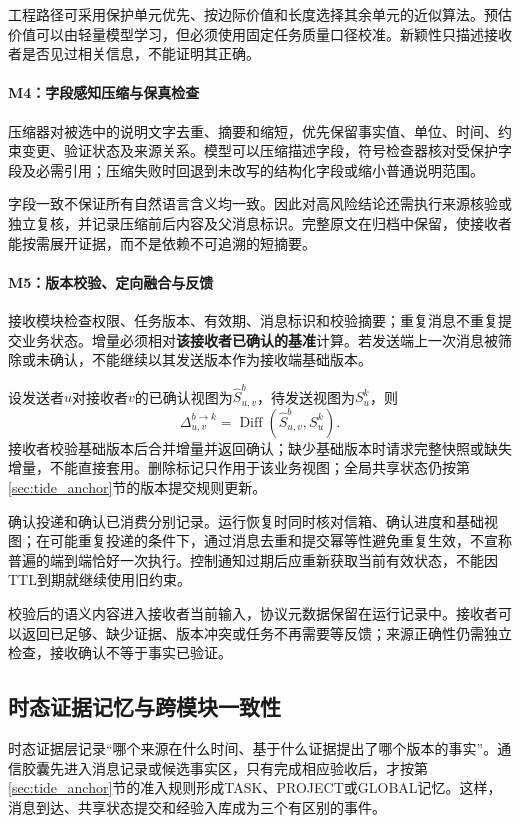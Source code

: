 工程路径可采用保护单元优先、按边际价值和长度选择其余单元的近似算法。预估价值可以由轻量模型学习，但必须使用固定任务质量口径校准。新颖性只描述接收者是否见过相关信息，不能证明其正确。

\paragraph{M4：字段感知压缩与保真检查}
压缩器对被选中的说明文字去重、摘要和缩短，优先保留事实值、单位、时间、约束变更、验证状态及来源关系。模型可以压缩描述字段，符号检查器核对受保护字段及必需引用；压缩失败时回退到未改写的结构化字段或缩小普通说明范围。

字段一致不保证所有自然语言含义均一致。因此对高风险结论还需执行来源核验或独立复核，并记录压缩前后内容及父消息标识。完整原文在归档中保留，使接收者能按需展开证据，而不是依赖不可追溯的短摘要。

\paragraph{M5：版本校验、定向融合与反馈}
接收模块检查权限、任务版本、有效期、消息标识和校验摘要；重复消息不重复提交业务状态。增量必须相对\textbf{该接收者已确认的基准}计算。若发送端上一次消息被筛除或未确认，不能继续以其发送版本作为接收端基础版本。

设发送者$u$对接收者$v$的已确认视图为$\widehat{S}_{u,v}^{b}$，待发送视图为$S_u^{k}$，则
\begin{equation}
\Delta_{u,v}^{b\rightarrow k}
=\operatorname{Diff}(\widehat{S}_{u,v}^{b},S_u^{k}).
\end{equation}
接收者校验基础版本后合并增量并返回确认；缺少基础版本时请求完整快照或缺失增量，不能直接套用。删除标记只作用于该业务视图；全局共享状态仍按第\ref{sec:tide_anchor}节的版本提交规则更新。

确认投递和确认已消费分别记录。运行恢复时同时核对信箱、确认进度和基础视图；在可能重复投递的条件下，通过消息去重和提交幂等性避免重复生效，不宣称普遍的端到端恰好一次执行。控制通知过期后应重新获取当前有效状态，不能因TTL到期就继续使用旧约束。

校验后的语义内容进入接收者当前输入，协议元数据保留在运行记录中。接收者可以返回已足够、缺少证据、版本冲突或任务不再需要等反馈；来源正确性仍需独立检查，接收确认不等于事实已验证。

\subsection{时态证据记忆与跨模块一致性}

时态证据层记录“哪个来源在什么时间、基于什么证据提出了哪个版本的事实”。通信胶囊先进入消息记录或候选事实区，只有完成相应验收后，才按第\ref{sec:tide_anchor}节的准入规则形成TASK、PROJECT或GLOBAL记忆。这样，消息到达、共享状态提交和经验入库成为三个有区别的事件。


